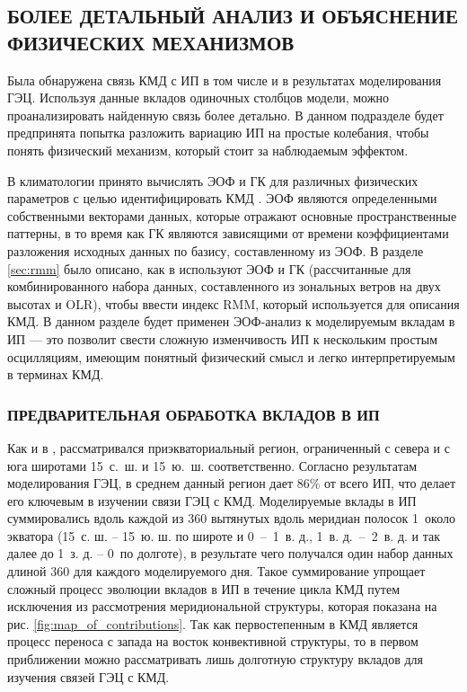\subsection{БОЛЕЕ ДЕТАЛЬНЫЙ АНАЛИЗ И ОБЪЯСНЕНИЕ ФИЗИЧЕСКИХ МЕХАНИЗМОВ}
\label{sec:futher_analysis}

Была обнаружена связь КМД с ИП в том числе и в результатах моделирования ГЭЦ. Используя данные вкладов одиночных столбцов модели, можно проанализировать найденную связь более детально. В данном подразделе будет предпринята попытка разложить вариацию ИП на простые колебания, чтобы понять физический механизм, который стоит за наблюдаемым эффектом.

В климатологии принято вычислять ЭОФ и ГК для различных физических параметров с целью идентифицировать КМД \cite{Knutson_Weickmann_1987, Slingo_et_al_1999, Lo_Hendon_2000, Matthews_2000, Kessler_2001}. ЭОФ являются определенными собственными векторами данных, которые отражают основные пространственные паттерны, в то время как ГК являются зависящими от времени коэффициентами разложения исходных данных по базису, составленному из ЭОФ. В разделе \ref{sec:rmm} было описано, как в \cite{Wheeler_Hendon_2004} используют ЭОФ и ГК (рассчитанные для комбинированного набора данных, составленного из зональных ветров на двух высотах и OLR), чтобы ввести индекс RMM, который используется для описания КМД. В данном разделе будет применен ЭОФ-анализ к моделируемым вкладам в ИП --- это позволит свести сложную изменчивость ИП к нескольким простым осцилляциям, имеющим понятный физический смысл и легко интерпретируемым в терминах КМД.

\subsubsection{ПРЕДВАРИТЕЛЬНАЯ ОБРАБОТКА ВКЛАДОВ В ИП}
\label{sec:preliminary_processing}

Как и в \cite{Wheeler_Hendon_2004}, рассматривался приэкваториальный регион, ограниченный с севера и с юга широтами 15\textdegree~с.~ш. и 15\textdegree~ю.~ш. соответственно. Согласно результатам моделирования ГЭЦ, в среднем данный регион дает 86\% от всего ИП, что делает его ключевым в изучении связи ГЭЦ с КМД. Моделируемые вклады в ИП суммировались вдоль каждой из 360 вытянутых вдоль меридиан полосок 1\textdegree{}\textdegree\ около экватора (15\textdegree\ с. ш. -- 15\textdegree\ ю. ш. по широте и 0\textdegree~--~1\textdegree\ в. д., 1\textdegree\ в. д.~--~2\textdegree\ в. д. и так далее до 1\textdegree\ з. д. -- 0\textdegree\ по долготе), в результате чего получался один набор данных длиной 360 для каждого моделируемого дня. Такое суммирование упрощает сложный процесс эволюции вкладов в ИП в течение цикла КМД путем исключения из рассмотрения меридиональной структуры, которая показана на рис. \ref{fig:map_of_contributions}. Так как первостепенным в КМД является процесс переноса с запада на восток конвективной структуры, то в первом приближении можно рассматривать лишь долготную структуру вкладов для изучения связей ГЭЦ с КМД.

